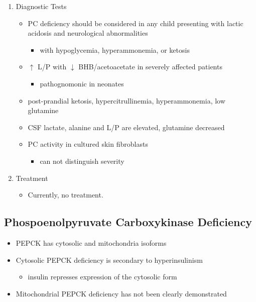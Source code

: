 \documentclass{scrartcl}
\begin{document}
\begin{enumerate}
\item Diagnostic Tests
\label{sec:org32f3f87}
\begin{itemize}
\item PC deficiency should be considered in any child presenting with
lactic acidosis and neurological abnormalities
\begin{itemize}
\item with hypoglycemia, hyperammonemia, or ketosis
\end{itemize}

\item \(\uparrow\) L/P with \(\downarrow\) BHB/acetoacetate in severely affected patients
\begin{itemize}
\item pathognomonic in neonates
\end{itemize}

\item post-prandial ketosis, hypercitrullinemia, hyperammonemia, low glutamine

\item CSF lactate, alanine and L/P are elevated, glutamine decreased

\item PC activity in cultured skin fibroblasts
\begin{itemize}
\item can not distinguish severity
\end{itemize}
\end{itemize}

\item Treatment
\label{sec:orga21fe49}

\begin{itemize}
\item Currently, no treatment.
\end{itemize}
\end{enumerate}

\subsection{Phospoenolpyruvate Carboxykinase Deficiency}
\label{sec:org9ba8935}
\begin{itemize}
\item PEPCK has cytosolic and mitochondria isoforms
\item Cytosolic PEPCK deficiency is secondary to hyperinsulinism
\begin{itemize}
\item insulin represses expression of the cytosolic form
\end{itemize}
\item Mitochondrial PEPCK deficiency has not been clearly demonstrated
\end{itemize}
\end{document}
